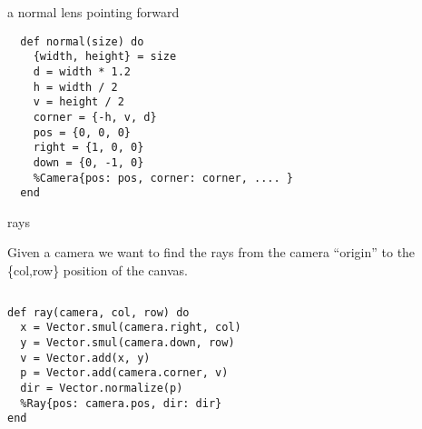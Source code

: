 \begin{frame}[fragile]{a normal lens pointing forward}

\begin{verbatim}
  def normal(size) do
    {width, height} = size
    d = width * 1.2
    h = width / 2
    v = height / 2
    corner = {-h, v, d}
    pos = {0, 0, 0}
    right = {1, 0, 0}
    down = {0, -1, 0}
    %Camera{pos: pos, corner: corner, .... }
  end
\end{verbatim}

\end{frame}


\begin{frame}[fragile]{rays}

Given a camera we want to find the rays from the camera ``origin'' to
the \{col,row\} position of the canvas.


\begin{columns}
 \begin{column}{0.5\linewidth}
\begin{verbatim}
def ray(camera, col, row) do
  x = Vector.smul(camera.right, col)
  y = Vector.smul(camera.down, row)
  v = Vector.add(x, y)
  p = Vector.add(camera.corner, v)
  dir = Vector.normalize(p)
  %Ray{pos: camera.pos, dir: dir}
end
\end{verbatim}
 \end{column}
 \begin{column}{0.5\linewidth}

 \end{column}
\end{columns}

\end{frame}


